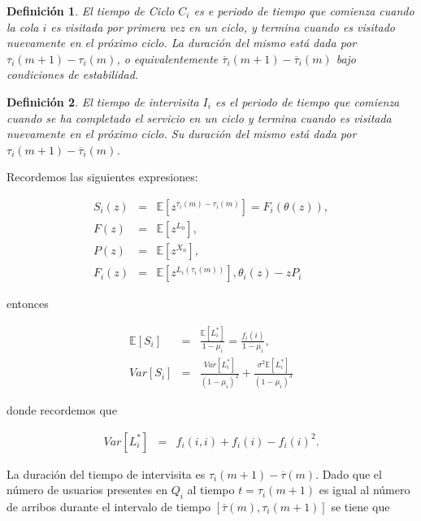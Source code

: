 \documentclass{article}
\newtheorem{Def}{Definición}[section]
\newcommand{\esp}{\mathbb{E}}
\numberwithin{equation}{section}
\begin{document}
\begin{Def}
El tiempo de Ciclo $C_{i}$ es e periodo de tiempo que comienza cuando la cola $i$ es visitada por primera vez en un ciclo, y termina cuando es visitado nuevamente en el pr\'oximo ciclo. La duraci\'on del mismo est\'a dada por $\tau_{i}\left(m+1\right)-\tau_{i}\left(m\right)$, o equivalentemente $\overline{\tau}_{i}\left(m+1\right)-\overline{\tau}_{i}\left(m\right)$ bajo condiciones de estabilidad.
\end{Def}

\begin{Def}
El tiempo de intervisita $I_{i}$ es el periodo de tiempo que comienza cuando se ha completado el servicio en un ciclo y termina cuando es visitada nuevamente en el pr\'oximo ciclo. Su  duraci\'on del mismo est\'a dada por $\tau_{i}\left(m+1\right)-\overline{\tau}_{i}\left(m\right)$.
\end{Def}


Recordemos las siguientes expresiones:

\begin{eqnarray*}
S_{i}\left(z\right)&=&\esp\left[z^{\overline{\tau}_{i}\left(m\right)-\tau_{i}\left(m\right)}\right]=F_{i}\left(\theta\left(z\right)\right),\\
F\left(z\right)&=&\esp\left[z^{L_{0}}\right],\\
P\left(z\right)&=&\esp\left[z^{X_{n}}\right],\\
F_{i}\left(z\right)&=&\esp\left[z^{L_{i}\left(\tau_{i}\left(m\right)\right)}\right],
\theta_{i}\left(z\right)-zP_{i}
\end{eqnarray*}

entonces 

\begin{eqnarray*}
\esp\left[S_{i}\right]&=&\frac{\esp\left[L_{i}^{*}\right]}{1-\mu_{i}}=\frac{f_{i}\left(i\right)}{1-\mu_{i}},\\
Var\left[S_{i}\right]&=&\frac{Var\left[L_{i}^{*}\right]}{\left(1-\mu_{i}\right)^{2}}+\frac{\sigma^{2}\esp\left[L_{i}^{*}\right]}{\left(1-\mu_{i}\right)^{3}}
\end{eqnarray*}

donde recordemos que

\begin{eqnarray*}
Var\left[L_{i}^{*}\right]&=&f_{i}\left(i,i\right)+f_{i}\left(i\right)-f_{i}\left(i\right)^{2}.
\end{eqnarray*}

La duraci\'on del tiempo de intervisita es $\tau_{i}\left(m+1\right)-\overline{\tau}\left(m\right)$. Dado que el n\'umero de usuarios presentes en $Q_{i}$ al tiempo $t=\tau_{i}\left(m+1\right)$ es igual al n\'umero de arribos durante el intervalo de tiempo $\left[\overline{\tau}\left(m\right),\tau_{i}\left(m+1\right)\right]$ se tiene que
\end{document}
